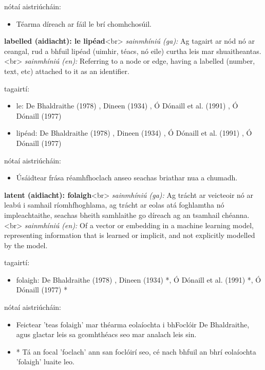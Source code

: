 \documentclass{article}
\begin{document}
nótaí aistriúcháin:
\begin{itemize}
	\item Téarma díreach ar fáil le brí chomhchosúil.
\end{itemize}


\textbf{labelled (aidiacht): le lipéad}<br>
\textit{sainmhíniú (ga):} Ag tagairt ar nód nó ar ceangal, rud a bhfuil lipéad (uimhir, téacs, nó eile) curtha leis mar shuaitheantas.<br>
\textit{sainmhíniú (en):} Referring to a node or edge, having a labelled (number, text, etc) attached to it as an identifier.

tagairtí:
\begin{itemize}
	\item le: De Bhaldraithe (1978) \cite{de-bhaldraithe}, Dineen (1934) \cite{dineen}, Ó Dónaill et al. (1991) \cite{focloir-beag}, Ó Dónaill (1977) \cite{odonaill}
	\item lipéad: De Bhaldraithe (1978) \cite{de-bhaldraithe}, Dineen (1934) \cite{dineen}, Ó Dónaill et al. (1991) \cite{focloir-beag}, Ó Dónaill (1977) \cite{odonaill}
\end{itemize}

nótaí aistriúcháin:
\begin{itemize}
	\item Úsáidtear frása réamhfhoclach anseo seachas briathar nua a chumadh.
\end{itemize}


\textbf{latent (aidiacht): folaigh}<br>
\textit{sainmhíniú (ga):} Ag trácht ar veicteoir nó ar leabú i samhail ríomhfhoghlama, ag trácht ar eolas atá foghlamtha nó impleachtaithe, seachas bheith samhlaithe go díreach ag an tsamhail chéanna.<br>
\textit{sainmhíniú (en):} Of a vector or embedding in a machine learning model, representing information that is learned or implicit, and not explicitly modelled by the model.

tagairtí:
\begin{itemize}
	\item folaigh: De Bhaldraithe (1978) \cite{de-bhaldraithe}, Dineen (1934) \cite{dineen}*, Ó Dónaill et al. (1991) \cite{focloir-beag}*, Ó Dónaill (1977) \cite{odonaill}*
\end{itemize}

nótaí aistriúcháin:
\begin{itemize}
	\item Feictear 'teas folaigh' mar théarma eolaíochta i bhFoclóir De Bhaldraithe, agus glactar leis sa gcomhthéacs seo mar analach leis sin.
	\item * Tá an focal 'foclach' ann san foclóirí seo, cé nach bhfuil an bhrí eolaíochta 'folaigh' luaite leo.
\end{itemize}
\end{document}
